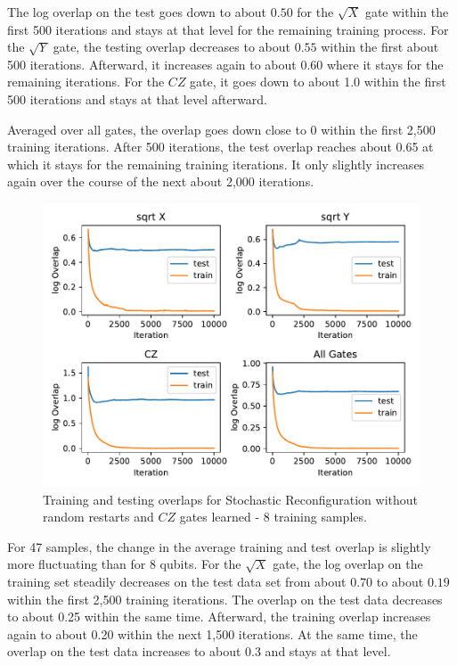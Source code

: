 The log overlap on the test goes down to about $0.50$ for the $\sqrt{X}$ gate within the first 500 iterations and stays at 
that level for the remaining training process. For the $\sqrt{Y}$ gate, the testing overlap decreases to about 
$0.55$ within the first about 500 iterations. Afterward, it increases again to about 0.60 where it stays for the 
remaining iterations. For the $CZ$ gate, it goes down to about 1.0 within the first 500 iterations and stays at 
that level afterward.

Averaged over all gates, the overlap goes down close to 0 within the first 2,500 training iterations. 
After 500 iterations, the test 
overlap reaches about 0.65 at which it stays for the remaining training iterations. It only 
slightly increases again over the course of the next about 2,000 iterations.


\begin{figure}[H]
  \centering
  \includegraphics[width=\textwidth]{figures/results/sr-no-restarts-learned/avgOverlap_8.pdf}
  \caption[Training and Testing Overlaps for Stochastic Reconfiguration without Random Restarts and $CZ$ Gates Learned - 8 Samples]{ 
  Training and testing overlaps for Stochastic Reconfiguration without random restarts and $CZ$ gates learned - 8 training samples.}
  \label{fig:sr_no_restarts_overlap_8}
\end{figure}

For 47 samples, the change in the average training and test overlap is slightly more fluctuating than for 8 qubits. For the 
$\sqrt{X}$ gate, the log overlap on the training set steadily decreases on the test data set from 
about $0.70$ to about $0.19$ within the first 2,500 training iterations. The overlap on the test data 
decreases to about 0.25 within the same time. Afterward, the training overlap increases again to about 
0.20 within the next 1,500 iterations. At the same time, the overlap on the test data increases to about 
0.3 and stays at that level.

